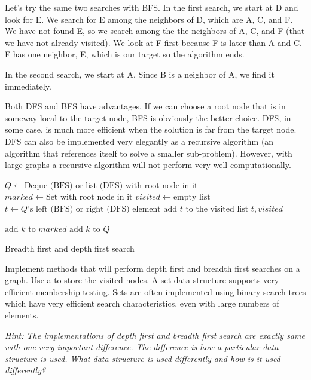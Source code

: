Let's try the same two searches with BFS.
In the first search, we start at D and look for E.
We search for E among the neighbors of D, which are A, C, and F.
We have not found E, so we search among the the neighbors of A, C, and F (that we have not already visited).
We look at F first because F  is later than A and C.
F has one neighbor, E, which is our target so the algorithm ends.

In the second search, we start at A.
Since B is a neighbor of A, we find it immediately.

Both DFS and BFS have advantages.  
If we can choose a root node that is in someway local to the target node, BFS is obviously the better choice.
DFS, in some case, is much more efficient when the solution is far from the target node.
DFS can also be implemented very elegantly as a recursive algorithm (an algorithm that references itself to solve a smaller sub-problem).
However, with large graphs a recursive algorithm will not perform very well computationally.

\begin{algorithm}
\begin{algorithmic}[1]
	\State $Q \gets \text{Deque (BFS) or list (DFS) with root node in it}$	
	\State $marked \gets \text{Set with root node in it}$	
	\State $visited \gets \text{empty list}$	
							
		\State $t \gets Q\text{'s left (BFS) or right (DFS) element}$	
		\State $\text{add }t \text{ to the visited list}$
									
			\State {} $t,visited$
		
		\Else										{}
					\State $\text{add } k \text{ to } marked$
					\State $\text{add } k \text{ to } Q$
				\EndIf
			\EndFor
		\EndIf
	\EndWhile
\EndProcedure
\end{algorithmic}
\caption{Breadth first and depth first search}
\label{alg:BFSDFS}
\end{algorithm}

\begin{problem}
Implement methods that will perform depth first and breadth first searches on a graph.
Use a  to store the visited nodes.  A set data structure supports very efficient membership testing.
Sets are often implemented using binary search trees which have very efficient search characteristics, even with large numbers of elements.

\textit{Hint: The implementations of depth first and breadth first search are exactly same with one very important difference.
The difference is how a particular data structure is used.  What data structure is used differently and how is it used differently?}
\end{problem}


